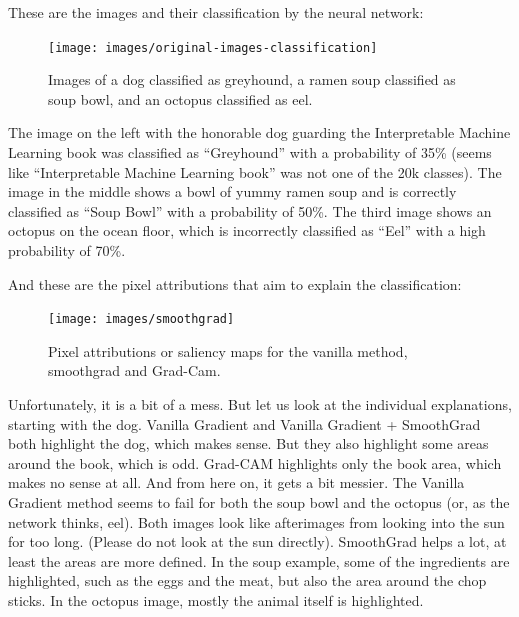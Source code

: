 \documentclass[
  12pt,
]{krantz}
\begin{document}
These are the images and their classification by the neural network:

\begin{figure}

{\centering \texttt{[image: images/original-images-classification]} 

}

\caption{Images of a dog classified as greyhound, a ramen soup classified as soup bowl, and an octopus classified as eel.}\label{fig:unnamed-chunk-62}
\end{figure}

The image on the left with the honorable dog guarding the Interpretable Machine Learning book was classified as ``Greyhound'' with a probability of 35\% (seems like ``Interpretable Machine Learning book'' was not one of the 20k classes).
The image in the middle shows a bowl of yummy ramen soup and is correctly classified as ``Soup Bowl'' with a probability of 50\%.
The third image shows an octopus on the ocean floor, which is incorrectly classified as ``Eel'' with a high probability of 70\%.

And these are the pixel attributions that aim to explain the classification:

\begin{figure}

{\centering \texttt{[image: images/smoothgrad]} 

}

\caption{Pixel attributions or saliency maps for the vanilla method, smoothgrad and Grad-Cam.}\label{fig:unnamed-chunk-63}
\end{figure}

Unfortunately, it is a bit of a mess.
But let us look at the individual explanations, starting with the dog.
Vanilla Gradient and Vanilla Gradient + SmoothGrad both highlight the dog, which makes sense.
But they also highlight some areas around the book, which is odd.
Grad-CAM highlights only the book area, which makes no sense at all.
And from here on, it gets a bit messier.
The Vanilla Gradient method seems to fail for both the soup bowl and the octopus (or, as the network thinks, eel).
Both images look like afterimages from looking into the sun for too long.
(Please do not look at the sun directly).
SmoothGrad helps a lot, at least the areas are more defined.
In the soup example, some of the ingredients are highlighted, such as the eggs and the meat, but also the area around the chop sticks.
In the octopus image, mostly the animal itself is highlighted.
\end{document}
